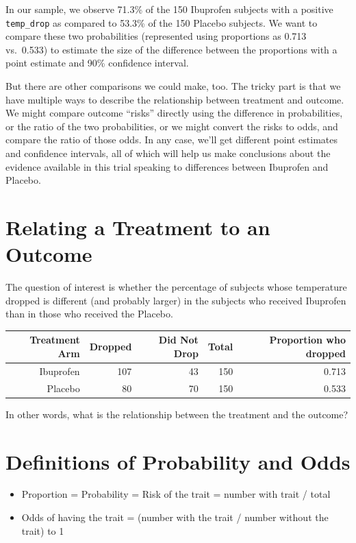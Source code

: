 \documentclass[
]{book}
\providecommand{\tightlist}{%
  \setlength{\itemsep}{0pt}\setlength{\parskip}{0pt}}
\begin{document}
In our sample, we observe 71.3\% of the 150 Ibuprofen subjects with a positive \texttt{temp\_drop} as compared to 53.3\% of the 150 Placebo subjects. We want to compare these two probabilities (represented using proportions as 0.713 vs.~0.533) to estimate the size of the difference between the proportions with a point estimate and 90\% confidence interval.

But there are other comparisons we could make, too. The tricky part is that we have multiple ways to describe the relationship between treatment and outcome. We might compare outcome ``risks'' directly using the difference in probabilities, or the ratio of the two probabilities, or we might convert the risks to odds, and compare the ratio of those odds. In any case, we'll get different point estimates and confidence intervals, all of which will help us make conclusions about the evidence available in this trial speaking to differences between Ibuprofen and Placebo.

\hypertarget{relating-a-treatment-to-an-outcome}{%
\section{Relating a Treatment to an Outcome}\label{relating-a-treatment-to-an-outcome}}

The question of interest is whether the percentage of subjects whose temperature dropped is different (and probably larger) in the subjects who received Ibuprofen than in those who received the Placebo.

\begin{longtable}[]{@{}rrrrr@{}}
\toprule
Treatment Arm & Dropped & Did Not Drop & Total & Proportion who dropped\tabularnewline
\midrule
\endhead
Ibuprofen & 107 & 43 & 150 & 0.713\tabularnewline
Placebo & 80 & 70 & 150 & 0.533\tabularnewline
\bottomrule
\end{longtable}

In other words, what is the relationship between the treatment and the outcome?

\hypertarget{definitions-of-probability-and-odds}{%
\section{Definitions of Probability and Odds}\label{definitions-of-probability-and-odds}}

\begin{itemize}
\tightlist
\item
  Proportion = Probability = Risk of the trait = number with trait / total
\item
  Odds of having the trait = (number with the trait / number without the trait) to 1
\end{itemize}
\end{document}
